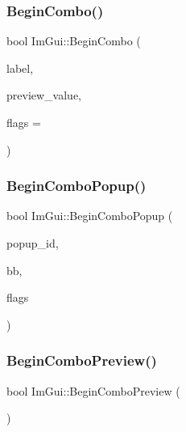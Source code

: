 \mbox{\label{namespaceImGui_aa895095bdc7a2907375c555e245575ea}} 
\subsubsection{\texorpdfstring{Begin\+Combo()}{BeginCombo()}}
{\footnotesize\ttfamily bool Im\+Gui\+::\+Begin\+Combo (\begin{DoxyParamCaption}\item[{const char $\ast$}]{label,  }\item[{const char $\ast$}]{preview\+\_\+value,  }\item[{Im\+Gui\+Combo\+Flags}]{flags = {} }\end{DoxyParamCaption})}

\mbox{\label{namespaceImGui_a6ecb51142fcb72cd19ff002c3a7d8e25}} 
\subsubsection{\texorpdfstring{Begin\+Combo\+Popup()}{BeginComboPopup()}}
{\footnotesize\ttfamily bool Im\+Gui\+::\+Begin\+Combo\+Popup (\begin{DoxyParamCaption}\item[{Im\+Gui\+ID}]{popup\+\_\+id,  }\item[{const \hyperlink{structImRect}{Im\+Rect} \&}]{bb,  }\item[{Im\+Gui\+Combo\+Flags}]{flags }\end{DoxyParamCaption})}

\mbox{\label{namespaceImGui_af01e0208ad7266965d3812a5198411f8}} 
\subsubsection{\texorpdfstring{Begin\+Combo\+Preview()}{BeginComboPreview()}}
{\footnotesize\ttfamily bool Im\+Gui\+::\+Begin\+Combo\+Preview (\begin{DoxyParamCaption}{ }\end{DoxyParamCaption})}


